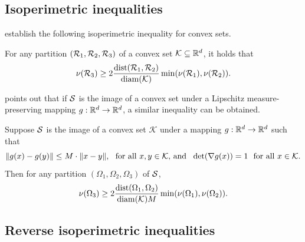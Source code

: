 \subsection{Isoperimetric inequalities}
\label{subsec:isoperimetric_inequalities}
\citet{dyer1991b} establish the following isoperimetric inequality for convex sets.
\begin{lemma}
	\label{lem:convex_isoperimetric_inequality}
	For any partition $(\mathcal{R}_1,\mathcal{R}_2,\mathcal{R}_3)$ of a convex set $\mathcal{K} \subseteq \mathbb{R}^d$, it holds that
	\begin{equation*}
	\nu(\mathcal{R}_3) \geq 2\frac{\mathrm{dist}(\mathcal{R}_1, \mathcal{R}_2)}{\mathrm{diam}(\mathcal{K})} \min(\nu(\mathcal{R}_1), \nu(\mathcal{R}_2)).
	\end{equation*}
\end{lemma}
\citet{abbasi-yadkori2016a} points out that if $\mathcal{S}$ is the image of a convex set under a Lipschitz measure-preserving mapping $g: \mathbb{R}^d \to \mathbb{R}^d$, a similar inequality can be obtained.
\begin{corollary}
	\label{cor:nonconvex_isoperimetric_inequality}
	Suppose $\mathcal{S}$ is the image of a convex set $\mathcal{K}$ under a mapping $g:\mathbb{R}^d \to \mathbb{R}^d$ such that
	\begin{equation*}
	\|g(x) - g(y)\| \leq M \cdot \|x - y\|,~~\textrm{for all $x,y \in \mathcal{K}$, and}~~\det(\nabla g(x)) = 1~~\textrm{for all $x \in \mathcal{K}$.}
	\end{equation*}
	Then for any partition $(\Omega_1,\Omega_2,\Omega_3)$ of $\mathcal{S}$, 
	\begin{equation*}
	\nu(\Omega_3) \geq 2\frac{\mathrm{dist}(\Omega_1, \Omega_2)}{\mathrm{diam}(\mathcal{K}) M} \min(\nu(\Omega_1), \nu(\Omega_2)).
	\end{equation*}
\end{corollary}

\subsection{Reverse isoperimetric inequalities}
\label{subsec:reverse_isoperimetric_inequalities}

